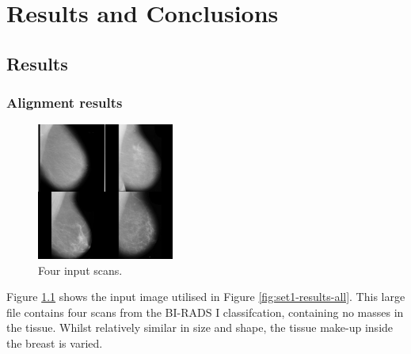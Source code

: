 \chapter{Results and Conclusions}




\section{Results}

\subsection{Alignment results}

\begin{figure}[H]
  \centering
  \includegraphics[width=0.4\textwidth]{Chapter3/results-img/big_scan.png}
  \caption{Four input scans.}
  \label{fig:input-data}
\end{figure}

Figure \ref{fig:input-data} shows the input image utilised in Figure \ref{fig:set1-results-all}. This large file contains four scans from the BI-RADS I classifcation, containing no masses in the tissue. Whilst relatively similar in size and shape, the tissue make-up inside the breast is varied.

